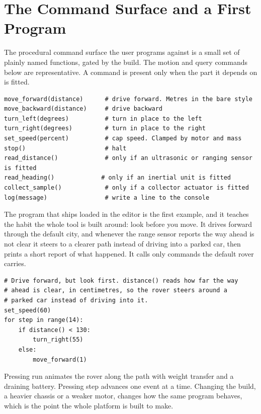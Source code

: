 \documentclass[11pt,a4paper]{report}
\begin{document}
\chapter{The Command Surface and a First Program}
The procedural command surface the user programs against is a small set of plainly named functions, gated by the build. The motion and query commands below are representative. A command is present only when the part it depends on is fitted.

\begin{lstlisting}
move_forward(distance)      # drive forward. Metres in the bare style
move_backward(distance)     # drive backward
turn_left(degrees)          # turn in place to the left
turn_right(degrees)         # turn in place to the right
set_speed(percent)          # cap speed. Clamped by motor and mass
stop()                      # halt
read_distance()             # only if an ultrasonic or ranging sensor is fitted
read_heading()             # only if an inertial unit is fitted
collect_sample()            # only if a collector actuator is fitted
log(message)                # write a line to the console
\end{lstlisting}

The program that ships loaded in the editor is the first example, and it teaches the habit the whole tool is built around: look before you move. It drives forward through the default city, and whenever the range sensor reports the way ahead is not clear it steers to a clearer path instead of driving into a parked car, then prints a short report of what happened. It calls only commands the default rover carries.

\begin{lstlisting}
# Drive forward, but look first. distance() reads how far the way
# ahead is clear, in centimetres, so the rover steers around a
# parked car instead of driving into it.
set_speed(60)
for step in range(14):
    if distance() < 130:
        turn_right(55)
    else:
        move_forward(1)
\end{lstlisting}

Pressing run animates the rover along the path with weight transfer and a draining battery. Pressing step advances one event at a time. Changing the build, a heavier chassis or a weaker motor, changes how the same program behaves, which is the point the whole platform is built to make.
\end{document}
